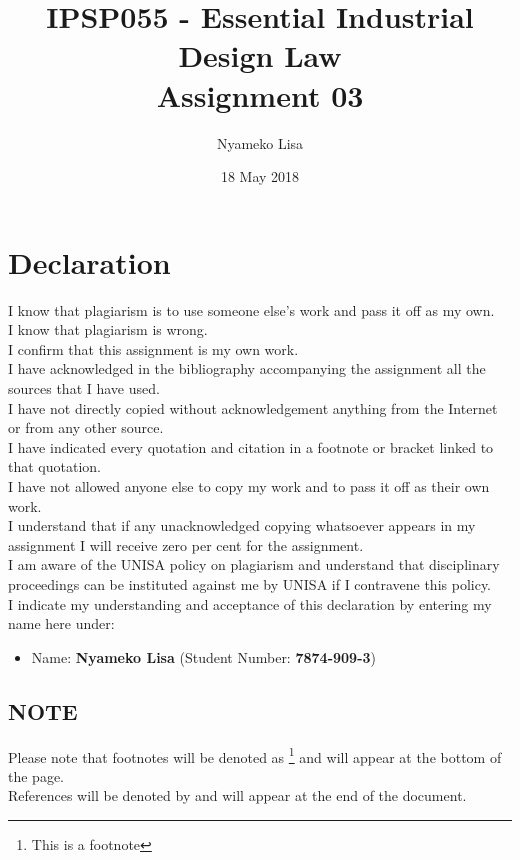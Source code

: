 \documentclass[11pt]{article}
\author{Nyameko Lisa}
\date{18 May 2018}
\title{IPSP055 - Essential Industrial Design Law\\\medskip
\large Assignment 03}
\begin{document}
\maketitle
\addvspace{110pt}

\justifying
\addvspace{110pt}
\section*{Declaration}
\label{sec:org9674b60}
I know that plagiarism is to use someone else’s work and pass it off as my own.\\
I know that plagiarism is wrong.\\
I confirm that this assignment is my own work.\\
I have acknowledged in the bibliography accompanying the assignment all the sources that I have used.\\
I have not directly copied without acknowledgement anything from the Internet or from any other source.\\
I have indicated every quotation and citation in a footnote or bracket linked to that quotation.\\
I have not allowed anyone else to copy my work and to pass it off as their own work.\\
I understand that if any unacknowledged copying whatsoever appears in my assignment I will receive zero per cent for the assignment.\\
I am aware of the UNISA policy on plagiarism and understand that disciplinary proceedings can be instituted against me by UNISA if I contravene this policy.\\
I indicate my understanding and acceptance of this declaration by
entering my name here under:
\begin{itemize}
\item Name: \textbf{Nyameko Lisa} (Student Number: \textbf{7874-909-3})
\end{itemize}

\subsection*{NOTE}
\label{sec:org3c268b4}
Please note that footnotes will be denoted as \footnote{This is a footnote} and will
appear at the bottom of the page.\\
References will be denoted by \cite{rsa93_designs_act} and will appear at the end of the document.
\newpage
\end{document}

